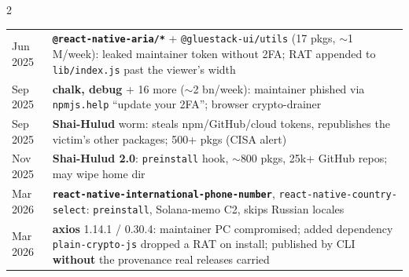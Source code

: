 \documentclass[8pt]{extarticle}
\newcommand\ct[1]{\texttt{#1}}
\newcommand\hd[1]{\par\vspace{3pt}\noindent{\bfseries\color{sheetBlue}#1}\par\vspace{1pt}}
\begin{document}

\begin{multicols}{2}
\raggedright{}

\hd{Incidents to name (all verified)}
{\footnotesize
\begin{tabular}{@{}>{\raggedright\arraybackslash}p{12mm}>{\raggedright\arraybackslash}p{60mm}@{}}
\toprule
Jun 2025 & \textbf{\ct{@react-native-aria/*}} + \ct{@gluestack-ui/utils} (17 pkgs, $\sim$1 M/week): leaked
           maintainer token without 2FA; RAT appended to \ct{lib/index.js} past the viewer's width \\
8 Sep 2025 & \textbf{chalk, debug} + 16 more ($\sim$2 bn/week): maintainer phished via \ct{npmjs.help}
           ``update your 2FA''; browser crypto-drainer \\
Sep 2025 & \textbf{Shai-Hulud} worm: steals npm/GitHub/cloud tokens, republishes the victim's other packages;
           500+ pkgs (CISA alert) \\
Nov 2025 & \textbf{Shai-Hulud 2.0}: \ct{preinstall} hook, $\sim$800 pkgs, 25k+ GitHub repos; may wipe home dir \\
Mar 2026 & \textbf{\ct{react-native-international-phone-number}}, \ct{react-native-country-select}:
           \ct{preinstall}, Solana-memo C2, skips Russian locales \\
31 Mar 2026 & \textbf{axios} 1.14.1 / 0.30.4: maintainer PC compromised; added dependency
           \ct{plain-crypto-js} dropped a RAT on install; published by CLI \textbf{without} the provenance real
           releases carried \\
\bottomrule
\end{tabular}}


\end{multicols}
\end{document}
